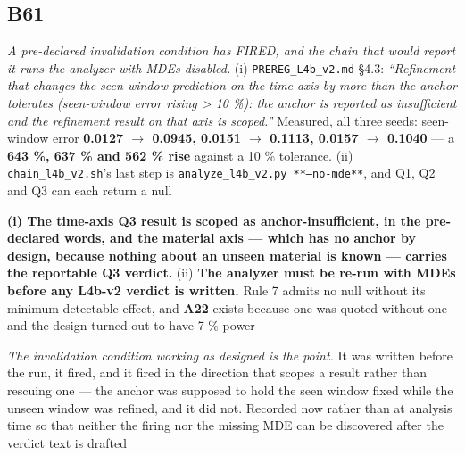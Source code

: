 \documentclass[10pt]{article}
\begin{document}
\subsection*{B61}\label{led:B61}
\begin{description}[leftmargin=0pt,itemsep=1pt]
\item[Defect.] \emph{A pre-declared invalidation condition has FIRED, and the chain that would report it runs the analyzer with MDEs disabled.} (i) \texttt{PREREG\_L4b\_v2.md} §4.3: \emph{``Refinement that changes the seen-window prediction on the time axis by more than the anchor tolerates (seen-window error rising > 10 \%): the anchor is reported as insufficient and the refinement result on that axis is scoped.''} Measured, all three seeds: seen-window error \textbf{0.0127 $\rightarrow$ 0.0945, 0.0151 $\rightarrow$ 0.1113, 0.0157 $\rightarrow$ 0.1040} --- a \textbf{643 \%, 637 \% and 562 \% rise} against a 10 \% tolerance. (ii) \texttt{chain\_l4b\_v2.sh}'s last step is \texttt{analyze\_l4b\_v2.py **--no-mde**}, and Q1, Q2 and Q3 can each return a null
\item[Resolution.] \textbf{(i) The time-axis Q3 result is scoped as anchor-insufficient, in the pre-declared words, and the material axis --- which has no anchor by design, because nothing about an unseen material is known --- carries the reportable Q3 verdict.} (ii) \textbf{The analyzer must be re-run with MDEs before any L4b-v2 verdict is written.} Rule 7 admits no null without its minimum detectable effect, and \textbf{A22} exists because one was quoted without one and the design turned out to have 7 \% power
\item[Note.] \emph{The invalidation condition working as designed is the point.} It was written before the run, it fired, and it fired in the direction that scopes a result rather than rescuing one --- the anchor was supposed to hold the seen window fixed while the unseen window was refined, and it did not. Recorded now rather than at analysis time so that neither the firing nor the missing MDE can be discovered after the verdict text is drafted
\end{description}
\end{document}
